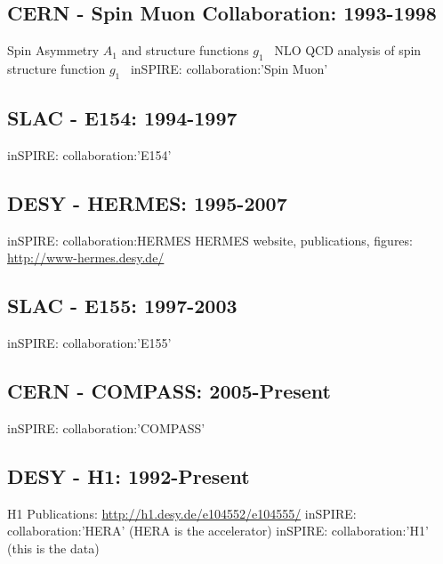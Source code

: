 \subsection{CERN - Spin Muon Collaboration: 1993-1998}
Spin Asymmetry $A_1$ and structure functions $g_1$~\cite{Adeva1998}
NLO QCD analysis of spin structure function $g_1$~\cite{Adeva1998a}
inSPIRE: collaboration:'Spin Muon'

\subsection{SLAC - E154: 1994-1997} 
inSPIRE: collaboration:'E154'

\subsection{DESY - HERMES: 1995-2007}
inSPIRE: collaboration:HERMES
HERMES website, publications, figures: \url{http://www-hermes.desy.de/}

\subsection{SLAC - E155: 1997-2003}
inSPIRE: collaboration:'E155'

\subsection{CERN - COMPASS: 2005-Present}
inSPIRE: collaboration:'COMPASS'

\subsection{DESY - H1: 1992-Present}
H1 Publications: \url{http://h1.desy.de/e104552/e104555/}
inSPIRE: collaboration:'HERA' (HERA is the accelerator)
inSPIRE: collaboration:'H1' (this is the data)

